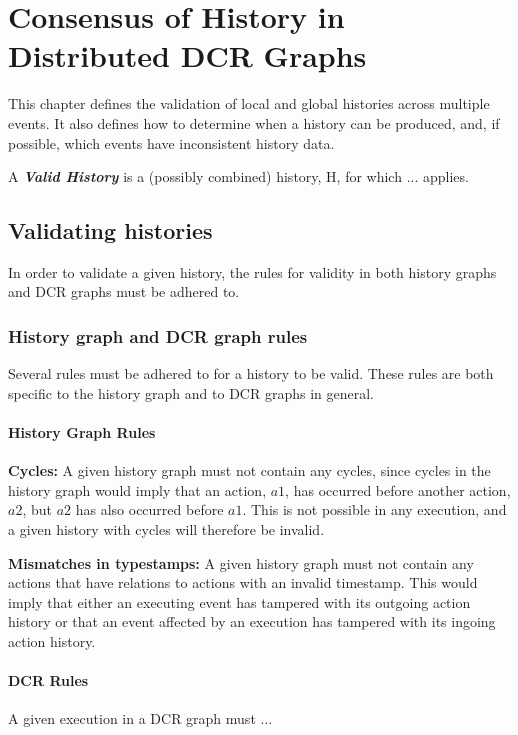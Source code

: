 \chapter{Consensus of History in Distributed DCR Graphs}
\label{chap:consensusindcr}
	This chapter defines the validation of local and global histories across multiple events. It also defines how to determine when a history can be produced, and, if possible, which events have inconsistent history data.
	 
	\begin{definition}
		A \textit{\textbf{Valid History}} is a (possibly combined) history, H, for which ... applies. 
	\end{definition}
	
	\section{Validating histories}
	In order to validate a given history, the rules for validity in both history graphs and DCR graphs must be adhered to. 
	
	\subsection{History graph and DCR graph rules}
	Several rules must be adhered to for a history to be valid. These rules are both specific to the history graph and to DCR graphs in general. 
	
	\subsubsection{History Graph Rules}
	\textbf{Cycles:} A given history graph must not contain any cycles, since cycles in the history graph would imply that an action, $a1$, has occurred before another action, $a2$, but $a2$ has also occurred before $a1$. This is not possible in any execution, and a given history with cycles will therefore be invalid.
	
	\newpar \textbf{Mismatches in typestamps:} A given history graph must not contain any actions that have relations to actions with an invalid timestamp. This would imply that either an executing event has tampered with its outgoing action history or that an event affected by an execution has tampered with its ingoing action history. 
	
	
	\subsubsection{DCR Rules}
	A given execution in a DCR graph must ... 
